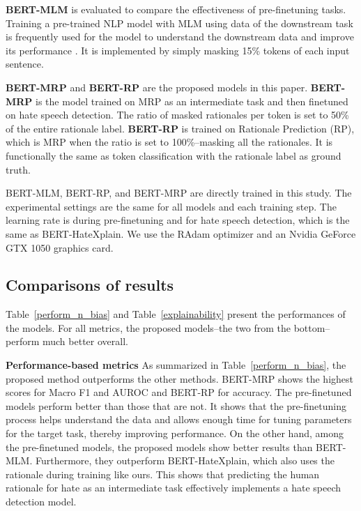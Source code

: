\documentclass[11pt]{article}
\begin{document}
\textbf{BERT-MLM} is evaluated to compare the effectiveness of pre-finetuning tasks. Training a pre-trained NLP model with MLM using data of the downstream task is frequently used for the model to understand the downstream data and improve its performance \citep{han2019unsupervised, ben2020perl, arefyev2021nb}. It is implemented by simply masking 15\% tokens of each input sentence.

\textbf{BERT-MRP} and \textbf{BERT-RP} are the proposed models in this paper. \textbf{BERT-MRP} is the model trained on MRP as an intermediate task and then finetuned on hate speech detection. The ratio of masked rationales per token is set to 50\% of the entire rationale label. \textbf{BERT-RP} is trained on Rationale Prediction (RP), which is MRP when the ratio is set to 100\%--masking all the rationales. It is functionally the same as token classification with the rationale label as ground truth.

BERT-MLM, BERT-RP, and BERT-MRP are directly trained in this study. The experimental settings are the same for all models and each training step. The learning rate is  during pre-finetuning and  for hate speech detection, which is the same as BERT-HateXplain. We use the RAdam optimizer and an Nvidia GeForce GTX 1050 graphics card.


\subsection{Comparisons of results}

Table~\ref{perform_n_bias} and Table~\ref{explainability} present the performances of the models. For all metrics, the proposed models--the two from the bottom--perform much better overall.

\noindent
\textbf{Performance-based metrics}  As summarized in Table~\ref{perform_n_bias}, the proposed method outperforms the other methods. BERT-MRP shows the highest scores for Macro F1 and AUROC and BERT-RP for accuracy. The pre-finetuned models perform better than those that are not. It shows that the pre-finetuning process helps understand the data and allows enough time for tuning parameters for the target task, thereby improving performance. On the other hand, among the pre-finetuned models, the proposed models show better results than BERT-MLM. Furthermore, they outperform BERT-HateXplain, which also uses the rationale during training like ours. This shows that predicting the human rationale for hate as an intermediate task effectively implements a hate speech detection model.
\end{document}
